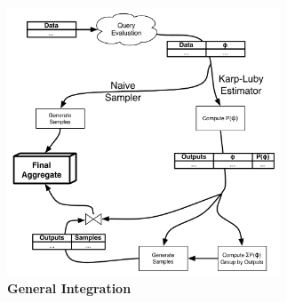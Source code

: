 \begin{figure}
\begin{center}
\includegraphics[width=3.2in]{graphics/sampling_flowchart.pdf}
\end{center}

\vspace{-5mm}

\caption{\textbf{General Integration}}
\label{fig:integration}
\end{figure}


